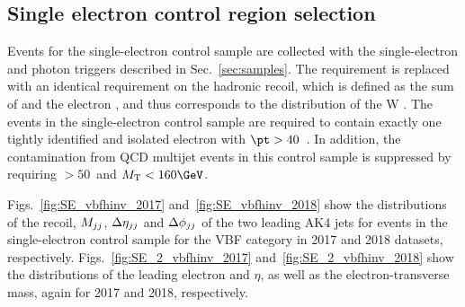 \newpage

\subsection{Single electron control region selection}
\label{sec:selection_cr_1e}
Events for the single-electron control sample are collected with the single-electron and photon triggers described in Sec.~\ref{sec:samples}.  
The \ptmiss requirement is replaced with an identical requirement on the hadronic recoil, which is defined as the sum of \ptvecmiss 
and the electron \vpt, and thus corresponds to the distribution of the W \pt.
The events in the single-electron control sample are required to contain exactly one tightly identified and isolated electron 
with $\pt > 40$~\GeV.
In addition, the contamination from QCD multijet events in this control sample is suppressed by requiring \MET$ > 50$~\GeV and $\mt < 160 \GeV$.

Figs.~\ref{fig:SE_vbfhinv_2017} and~\ref{fig:SE_vbfhinv_2018} show the distributions of the recoil, $M_{jj}$, $\Delta \eta_{jj}$ and 
$\Delta \phi_{jj}$ of the two leading AK4 jets for events in the single-electron control sample for the VBF category 
in 2017 and 2018 datasets, respectively. 
Figs.~\ref{fig:SE_2_vbfhinv_2017} and~\ref{fig:SE_2_vbfhinv_2018} show the distributions of the leading electron \pt and $\eta$, 
as well as the electron-\ptmiss transverse mass, again for 2017 and 2018, respectively.

